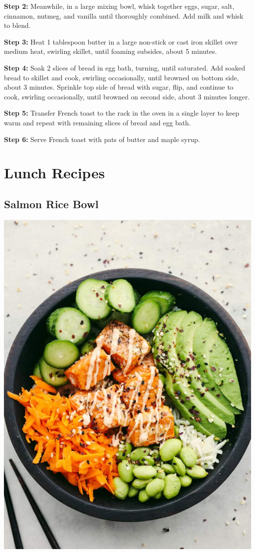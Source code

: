 \documentclass[
]{book}
\begin{document}
\textbf{Step 2:} Meanwhile, in a large mixing bowl, whisk together eggs,
sugar, salt, cinnamon, nutmeg, and vanilla until thoroughly combined.
Add milk and whisk to blend.

\textbf{Step 3:} Heat 1 tablespoon butter in a large non-stick or cast
iron skillet over medium heat, swirling skillet, until foaming subsides,
about 5 minutes.

\textbf{Step 4:} Soak 2 slices of bread in egg bath, turning, until
saturated. Add soaked bread to skillet and cook, swirling occasionally,
until browned on bottom side, about 3 minutes. Sprinkle top side of
bread with sugar, flip, and continue to cook, swirling occasionally,
until browned on second side, about 3 minutes longer.

\textbf{Step 5:} Transfer French toast to the rack in the oven in a
single layer to keep warm and repeat with remaining slices of bread and
egg bath.

\textbf{Step 6:} Serve French toast with pats of butter and maple syrup.

\chapter{Lunch Recipes}\label{lunch-recipes}

\section*{Salmon Rice Bowl}\label{salmon-rice-bowl}

\includegraphics{sb.jpg}
\end{document}
